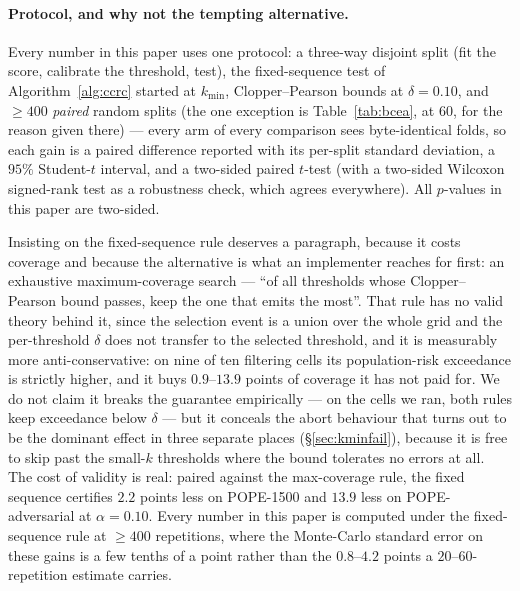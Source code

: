 \documentclass{article}
\theoremstyle{plain}
\theoremstyle{definition}
\theoremstyle{remark}
\begin{document}
\paragraph{Protocol, and why not the tempting alternative.}
Every number in this paper uses one protocol: a three-way disjoint split (fit the score,
calibrate the threshold, test), the fixed-sequence test of Algorithm~\ref{alg:ccrc} started at
$k_{\min}$, Clopper--Pearson bounds at $\delta=0.10$, and $\ge400$ \emph{paired} random splits
(the one exception is Table~\ref{tab:bcea}, at $60$, for the reason given there)
--- every arm of every comparison sees byte-identical folds, so each gain is a paired difference
reported with its per-split standard deviation, a $95\%$ Student-$t$ interval, and a two-sided
paired $t$-test (with a two-sided Wilcoxon signed-rank test as a robustness check, which agrees
everywhere). All $p$-values in this paper are two-sided.

Insisting on the fixed-sequence rule deserves a paragraph, because it costs coverage and
because the alternative is what an implementer reaches for first: an exhaustive
maximum-coverage search --- ``of all thresholds whose Clopper--Pearson bound passes, keep the
one that emits the most''. That rule has no valid theory behind it, since the selection event
is a union over the whole grid and the per-threshold $\delta$ does not transfer to the selected
threshold, and it is measurably more anti-conservative: on nine of ten filtering cells its
population-risk exceedance is strictly higher, and it buys $0.9$--$13.9$ points of coverage it
has not paid for. We do not claim it breaks the guarantee empirically --- on the cells we ran,
both rules keep exceedance below $\delta$ --- but it conceals the abort behaviour that turns out
to be the dominant effect in three separate places (\S\ref{sec:kminfail}), because it is free to
skip past the small-$k$ thresholds where the bound tolerates no errors at all. The cost of
validity is real: paired against the max-coverage rule, the fixed sequence certifies $2.2$
points less on POPE-1500 and $13.9$ less on POPE-adversarial at $\alpha=0.10$. Every number in
this paper is computed under the fixed-sequence rule at $\ge400$ repetitions, where the
Monte-Carlo standard error on these gains is a few tenths of a point rather than the
$0.8$--$4.2$ points a $20$--$60$-repetition estimate carries.
\end{document}
